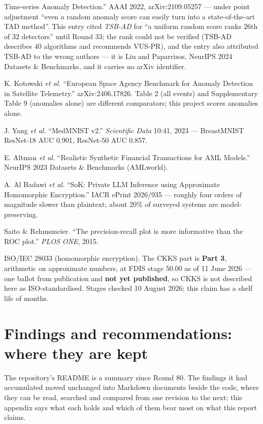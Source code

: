 \documentclass[11pt,a4paper]{article}
\begin{document}
\begin{small}
\begin{enumerate}[label={[\arabic*]},leftmargin=*,itemsep=1.5pt]
        Time-series Anomaly Detection.'' AAAI 2022, arXiv:2109.05257 --- under point adjustment ``even a
        random anomaly score can easily turn into a state-of-the-art TAD method''. This entry cited
        \emph{TSB-AD} for ``a uniform random score ranks 26th of 32 detectors'' until Round 33; the rank
        could not be verified (TSB-AD describes 40 algorithms and recommends VUS-PR), and the entry also
        attributed TSB-AD to the wrong authors --- it is Liu and Paparrizos, NeurIPS 2024 Datasets \&
        Benchmarks, and it carries no arXiv identifier.
  \item K. Kotowski \emph{et al.} ``European Space Agency Benchmark for Anomaly Detection in
        Satellite Telemetry.'' arXiv:2406.17826. Table 2 (all events) and Supplementary Table 9
        (anomalies alone) are different comparators; this project scores anomalies alone.
  \item J. Yang \emph{et al.} ``MedMNIST v2.'' \emph{Scientific Data} 10:41, 2023 --- BreastMNIST
        ResNet-18 AUC 0.901, ResNet-50 AUC 0.857.
  \item E. Altman \emph{et al.} ``Realistic Synthetic Financial Transactions for AML Models.''
        NeurIPS 2023 Datasets \& Benchmarks (AMLworld).
  \item A. Al Badawi \emph{et al.} ``SoK: Private LLM Inference using Approximate Homomorphic
        Encryption.'' IACR ePrint 2026/935 --- roughly four orders of magnitude slower than
        plaintext; about 20\% of surveyed systems are model-preserving.
  \item Saito \& Rehmsmeier. ``The precision-recall plot is more informative than the ROC plot.''
        \emph{PLOS ONE}, 2015.
  \item ISO/IEC 28033 (homomorphic encryption). The CKKS part is \textbf{Part 3}, arithmetic on
        approximate numbers, at FDIS stage 50.00 as of 11 June 2026 --- one ballot from publication
        and \textbf{not yet published}, so CKKS is not described here as ISO-standardised. Stages
        checked 10 August 2026; this claim has a shelf life of months.
\end{enumerate}
\end{small}

\appendix
\section{Findings and recommendations: where they are kept}

The repository's README is a summary since Round 80. The findings it had accumulated moved
unchanged into Markdown documents beside the code, where they can be read, searched and compared
from one revision to the next; this appendix says what each holds and which of them bear most on
what this report claims.
\end{document}
